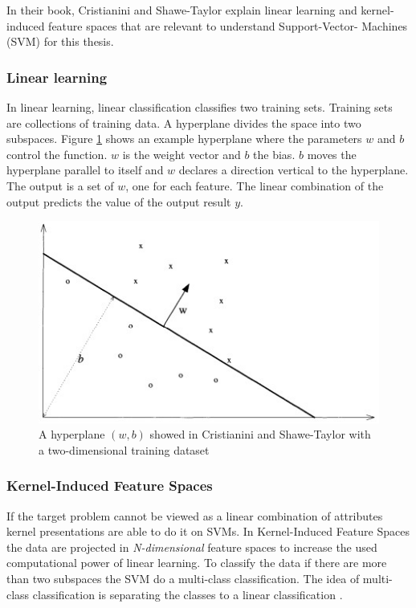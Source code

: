 In their book, Cristianini and Shawe-Taylor \cite{cristianini_shawe-taylor_2000} explain linear learning and kernel-induced feature spaces that are relevant to understand Support-Vector-
Machines (SVM) for this thesis.

\subsubsection*{Linear learning}

In linear learning, linear classification classifies two training sets. Training sets are collections of training data. A hyperplane divides the space into two subspaces.
\cite{cristianini_shawe-taylor_2000} Figure \ref{fig:hyperplane} shows an example hyperplane where the parameters $w$ and $b$ control the function. $w$ is the weight vector and $b$ the
bias. $b$ moves the hyperplane parallel to itself and $w$ declares a direction vertical to the hyperplane. The output is a set of $w$, one for each feature. The linear combination of the
output predicts the value of the output result $y$.

\begin{figure}[h!]
  \centering
  \includegraphics[width=12cm]{pictures/hyperplane.jpg}
  \caption{A hyperplane $(w, b)$ showed in Cristianini and Shawe-Taylor \cite{cristianini_shawe-taylor_2000} with a two-dimensional training dataset}
  \label{fig:hyperplane}
\end{figure}

\subsubsection*{Kernel-Induced Feature Spaces}

If the target problem cannot be viewed as a linear combination of attributes kernel presentations are able to do it on SVMs. In Kernel-Induced Feature Spaces the data are projected in
\textit{N-dimensional} feature spaces to increase the used computational power of linear learning. To classify the data if there are more than two subspaces the SVM do a multi-class
classification. The idea of multi-class classification is separating the classes to a linear classification \cite{tzotsos2008support}.

